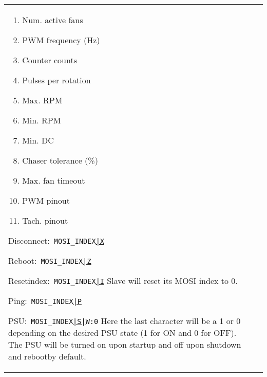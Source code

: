 \documentclass{article}
\begin{document}
\begin{center}
\begin{longtable}{| p{} | p{} |}
\begin{itemize}
{\begin{enumerate}
			\item Num. active fans
			\item PWM frequency (Hz)
			\item Counter counts
			\item Pulses per rotation 
			\item Max. RPM
			\item Min. RPM
			\item Min. DC
			\item Chaser tolerance (\%)
			\item Max. fan timeout
			\item PWM pinout
			\item Tach. pinout
			\end{enumerate}
		\item {Disconnect:}\
		\linebreak\texttt{MOSI\_INDEX\underline{|X}}
		\item {Reboot:}\
		\linebreak\texttt{MOSI\_INDEX\underline{|Z}}
		\item {Reset\hspace{.5em}index:}\
		\linebreak\texttt{MOSI\_INDEX\underline{|I}}
		\linebreak Slave will reset its MOSI index to 0.
		\item {Ping:}\
		\linebreak\texttt{MOSI\_INDEX\underline{|P}}
		\item {PSU:}\
		\linebreak\texttt{MOSI\_INDEX\underline{|S|}W:0}
		\linebreak Here the last character will be a 1 or 0 depending on the desired PSU			state (1 for ON and 0 for OFF). The PSU will be turned on upon startup and off
			upon shutdown and rebootby default.
		
}
\end{itemize}
\end{longtable}
\end{center}
\end{document}
